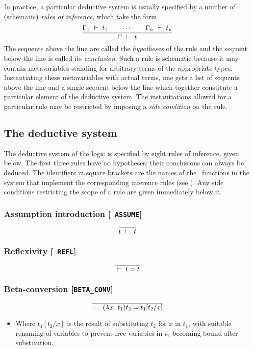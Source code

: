 In practice, a particular deductive system is usually specified by a
number of (schematic) \emph{rules of inference},
which take the form
\[
\frac{\Gamma_1\ \vdash\  t_1 \qquad\cdots\qquad\Gamma_n\ \vdash\  t_n}
{\Gamma \ \vdash\  t}
\]
The sequents above the line are called the {\it
hypotheses\/} of the rule and the
sequent below the line is called its {\it
conclusion}. Such a rule is
schematic because it may contain metavariables
standing for arbitrary terms of the appropriate types. Instantiating
these metavariables with actual terms, one gets a list of sequents
above the line and a single sequent below the line which together
constitute a particular element of the deductive system. The
instantiations allowed for a particular rule may be restricted by
imposing a {\em side condition\/} on the rule.


\subsection{The \HOL{} deductive system}
\label{HOLrules}

The deductive system of the \HOL{} logic is specified by eight rules
of inference, given below.  The first three rules have no hypotheses;
their conclusions can always be deduced. The identifiers in square
brackets are the names of the \ML\ functions in the \HOL{} system that
implement the corresponding inference rules (see \DESCRIPTION). Any
side conditions restricting the scope of a rule are given immediately
below it.

\bigskip

\subsubsection*{Assumption introduction [{\small\tt
ASSUME}]}
\[
\overline{t \ \vdash\  t}
\]

\subsubsection*{Reflexivity [{\small\tt
REFL}]}
\[
\overline{\ \vdash\  t = t}
\]

\subsubsection*{Beta-conversion [{\small\tt BETA\_CONV}]}
\[
\overline{\ \vdash\  (\lambda x.\ t_1)t_2 = t_1[t_2/x]}
\]
\begin{itemize}
\item Where $t_1[t_2/x]$ is
the result of substituting $t_2$ for $x$
in $t_1$, with suitable renaming of variables to prevent free variables
in $t_2$ becoming bound after substitution.
\end{itemize}

